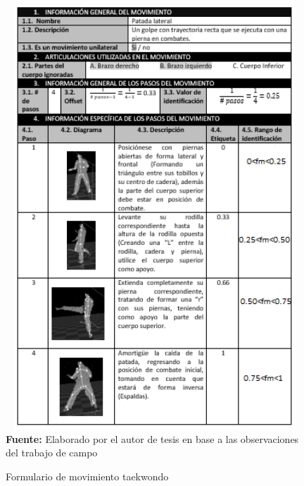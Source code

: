 \begin{figure}[H]
	\caption{Formulario de movimiento taekwondo}
	\label{fig:frmWhiteMov}
	\centering
	\includegraphics[width=445px,height=600px]{graphics/resultados/movimientoTaekwondo.PNG} \\
	\textbf{Fuente:} Elaborado por el autor de tesis en base a las observaciones del trabajo de campo
\end{figure}
